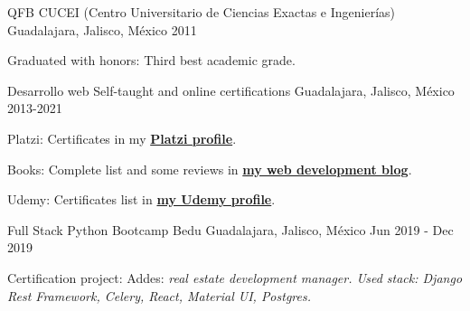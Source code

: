 

\begin{cventries}
  \cventry
    {QFB}
    {CUCEI (Centro Universitario de Ciencias Exactas e Ingenierías)}
    {Guadalajara, Jalisco, México}
    {2011}
    {
      \begin{cvitems}
        \item {Graduated with honors: Third best academic grade.}
      \end{cvitems}
    }

    \cventry
    {Desarrollo web}
    {Self-taught and online certifications}
    {Guadalajara, Jalisco, México}
    {2013-2021}
    {
      \begin{cvitems}
        \item {Platzi: Certificates in my \color{gray} \textbf{\href{https://platzi.com/@eduardo-zepeda/}{Platzi profile}}.}
        \item {Books: Complete list and some reviews in \color{gray} \textbf{ \href{https://coffeebytes.dev/en/books-ive-read-and-reviews/}{my web development blog}}.}
        \item {Udemy: Certificates list in \color{gray} \textbf{\href{https://www.udemy.com/user/carlos-eduardo-magallon-zepeda/}{my Udemy profile}}.}
      \end{cvitems}
    }

    \cventry
    {Full Stack Python Bootcamp}
    {Bedu}
    {Guadalajara, Jalisco, México}
    {Jun 2019 - Dec 2019}
    {
      \begin{cvitems}
        \item {Certification project: Addes: \textit{real estate development manager. Used stack: Django Rest Framework, Celery, React, Material UI, Postgres.}}
      \end{cvitems}
    }
\end{cventries}
